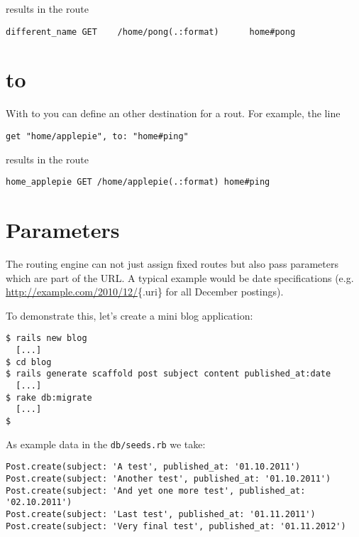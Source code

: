 \documentclass[a4paper]{book}
\newcommand{\chap}[1]{\newpage\thispagestyle{empty}\chapter{#1}\label{chap:\thechapter}}
\begin{document}
results in the route

\begin{shaded}\begin{verbatim}
different_name GET    /home/pong(.:format)      home#pong
\end{verbatim}\end{shaded}

\chap{to}\label{to}

With to you can define an other destination for a rout. For example, the line

\begin{shaded}\begin{verbatim}
get "home/applepie", to: "home#ping"
\end{verbatim}\end{shaded}

results in the route

\begin{shaded}\begin{verbatim}
home_applepie GET /home/applepie(.:format) home#ping
\end{verbatim}\end{shaded}

\chap{Parameters}\label{parameters}

The routing engine can not just assign fixed routes but also pass parameters which are part of the URL. A typical example would be date specifications (e.g. \url{http://example.com/2010/12/}\{.uri\} for all December postings).

To demonstrate this, let's create a mini blog application:

\begin{shaded}\begin{verbatim}
$ rails new blog
  [...]
$ cd blog
$ rails generate scaffold post subject content published_at:date
  [...]
$ rake db:migrate
  [...]
$
\end{verbatim}\end{shaded}

As example data in the \texttt{db/seeds.rb} we take:

\begin{shaded}\begin{verbatim}
Post.create(subject: 'A test', published_at: '01.10.2011')
Post.create(subject: 'Another test', published_at: '01.10.2011')
Post.create(subject: 'And yet one more test', published_at: '02.10.2011')
Post.create(subject: 'Last test', published_at: '01.11.2011')
Post.create(subject: 'Very final test', published_at: '01.11.2012')
\end{verbatim}\end{shaded}
\end{document}
